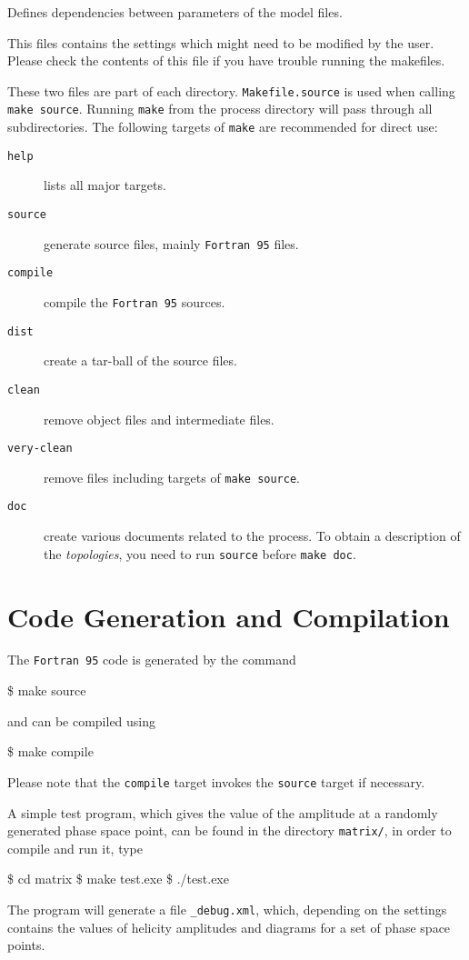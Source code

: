 \documentclass[11pt,a4paper]{refrep}
\newcommand{\fortranXC}{{\tt Fortran\,95}\xspace}
\begin{document}
 Defines dependencies between parameters of
the model files.

 This files contains the settings
which might need to be modified by the user. Please check the contents
of this file if you have trouble running the makefiles.

 These two files are part of
each directory. \texttt{Makefile.source} is used when calling
\texttt{make source}. Running \texttt{make} from the process
directory will pass through all subdirectories. The following
targets of \texttt{make} are recommended for direct use:
\begin{description}
\item[\texttt{help}] lists all major targets.
\item[\texttt{source}] generate source files, mainly \fortranXC files.
\item[\texttt{compile}] compile the \fortranXC sources.
\item[\texttt{dist}] create a tar-ball of the source files.
\item[\texttt{clean}] remove object files and intermediate files.
\item[\texttt{very-clean}] remove files including targets of
                                \texttt{make source}.
\item[\texttt{doc}] create various documents related to the process.
      To obtain a description of the \emph{topologies}, you need to run
      \texttt{source} before \texttt{make doc}.
\end{description}

\section{Code Generation and Compilation}
The \fortranXC code is generated by the command
\begin{example}
\$ make source
\end{example}
and can be compiled using
\begin{example}
\$ make compile
\end{example}
Please note that the \texttt{compile} target invokes
the \texttt{source} target if necessary.

A simple test program,
which gives the value of the amplitude at a randomly generated phase space point,
can be found in the directory \texttt{matrix/},
in order to compile and run it, type
\begin{example}
\$ cd matrix
\$ make test.exe
\$ ./test.exe
\end{example}
The program will generate a file \texttt{\_debug.xml},
which, depending on the settings contains the values of helicity amplitudes
and diagrams for a set of phase space points.
\end{document}
